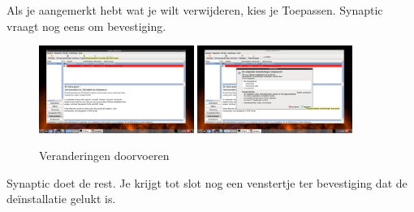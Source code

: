 \documentclass[12pt,a4paper]{article}
\begin{document}
Als je aangemerkt hebt wat je wilt verwijderen, kies je Toepassen. Synaptic vraagt nog eens om bevestiging.  

\begin{figure} [H]
\centering
\includegraphics[width=0.45\textwidth]{plaatje19}
\includegraphics[width=0.45\textwidth]{plaatje20}
\caption{Veranderingen doorvoeren}
\label{plaatje19}
\end{figure}

Synaptic doet de rest. Je krijgt tot slot nog een venstertje ter bevestiging dat de de\"{i}nstallatie gelukt is.
\end{document}
